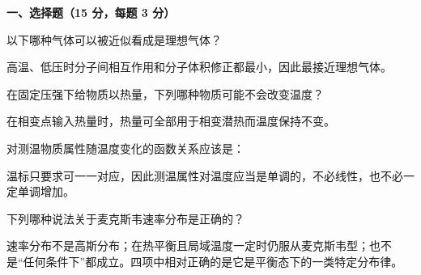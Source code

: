 ﻿


\textbf{一、选择题（15 分，每题 3 分）}
\begin{question}
以下哪种气体可以被近似看成是理想气体？
\begin{choiceoptions}
\end{choiceoptions}
\begin{solution}
高温、低压时分子间相互作用和分子体积修正都最小，因此最接近理想气体。
\end{solution}
\end{question}

\begin{question}
在固定压强下给物质以热量，下列哪种物质可能不会改变温度？
\begin{choiceoptions}
\end{choiceoptions}
\begin{solution}
在相变点输入热量时，热量可全部用于相变潜热而温度保持不变。
\end{solution}
\end{question}

\begin{question}
对测温物质属性随温度变化的函数关系应该是：
\begin{choiceoptions}
\end{choiceoptions}
\begin{solution}
温标只要求可一一对应，因此测温属性对温度应当是单调的，不必线性，也不必一定单调增加。
\end{solution}
\end{question}

\begin{question}
下列哪种说法关于麦克斯韦速率分布是正确的？
\begin{choiceoptions}
\end{choiceoptions}
\begin{solution}
速率分布不是高斯分布；在热平衡且局域温度一定时仍服从麦克斯韦型；也不是“任何条件下”都成立。四项中相对正确的是它是平衡态下的一类特定分布律。
\end{solution}
\end{question}

